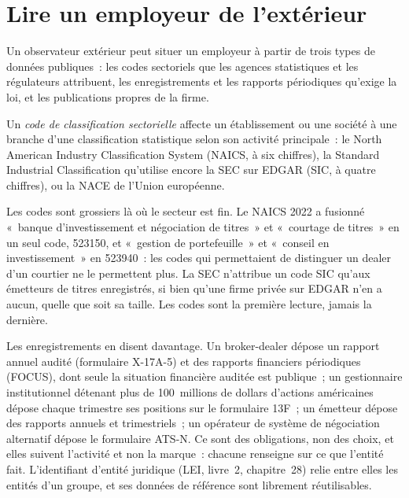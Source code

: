 \section{Lire un employeur de l'extérieur}

Un observateur extérieur peut situer un employeur à partir de trois types de données publiques~: les codes sectoriels que les agences statistiques et
les régulateurs attribuent, les enregistrements et les rapports périodiques qu'exige la loi, et les publications propres de la firme.

\begin{definition}\label{def:in:a-map-of-the-industry:code}
Un \emph{code de classification sectorielle} affecte un établissement ou une société à une
branche d'une classification statistique selon son activité principale~: le North American Industry Classification System
(NAICS, à six chiffres), la Standard Industrial Classification qu'utilise encore la SEC sur EDGAR (SIC, à quatre chiffres), ou la
NACE de l'Union européenne.
\end{definition}

Les codes sont grossiers là où le secteur est fin. Le NAICS 2022 a fusionné «~banque d'investissement et négociation de titres~» et
«~courtage de titres~» en un seul code, 523150, et «~gestion de portefeuille~» et «~conseil en investissement~» en 523940~: les
codes qui permettaient de distinguer un dealer d'un courtier ne le permettent plus. La SEC n'attribue un code SIC qu'aux émetteurs de
titres enregistrés, si bien qu'une firme privée sur EDGAR n'en a aucun, quelle que soit sa taille. Les codes sont la première lecture, jamais la dernière.

Les enregistrements en disent davantage. Un broker-dealer dépose un rapport annuel audité (formulaire X-17A-5) et des rapports financiers périodiques
(FOCUS), dont seule la situation financière auditée est publique~; un gestionnaire institutionnel détenant plus de 100~millions de dollars d'actions américaines dépose chaque trimestre ses positions sur le
formulaire 13F~; un émetteur dépose des rapports annuels et trimestriels~; un opérateur de système de négociation alternatif dépose le formulaire ATS-N.
Ce sont des obligations, non des choix, et elles suivent l'activité et non la marque~: chacune renseigne sur ce que l'entité
fait. L'identifiant d'entité juridique (LEI, livre~2, chapitre~28) relie entre elles les entités d'un groupe, et ses données de référence sont
librement réutilisables.

